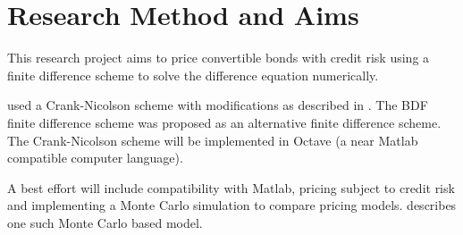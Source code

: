 \documentclass[a4paper,11pt,oneside]{article}
\newcommand{\setlinespacing}[1]
           {\renewcommand{\baselinestretch}{#1}\small\normalsize}
\begin{document}
\section{Research Method and Aims}
This research project aims to price convertible bonds with credit risk using a finite difference scheme to solve the difference equation numerically.

 used a Crank-Nicolson scheme with modifications as described in \citet{R84}.  The BDF finite difference scheme \cite{B98} was proposed as an alternative finite difference scheme.  The Crank-Nicolson scheme will be implemented in Octave (a near Matlab compatible computer language).

A best effort will include compatibility with Matlab, pricing subject to credit risk and implementing a Monte Carlo simulation to compare pricing models.  \citet{AKW08} describes one such Monte Carlo based model.


\clearpage
\setlinespacing{1}


\end{document}
